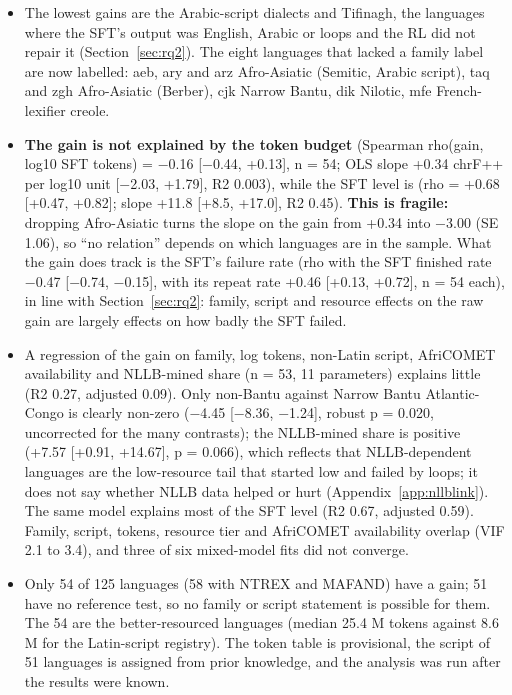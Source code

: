 \begin{itemize}
\item The lowest gains are the Arabic-script dialects and Tifinagh, the languages where the SFT's output was English, Arabic or loops and the RL did not repair it (Section~\ref{sec:rq2}). The eight languages that lacked a family label are now labelled: aeb, ary and arz Afro-Asiatic (Semitic, Arabic script), taq and zgh Afro-Asiatic (Berber), cjk Narrow Bantu, dik Nilotic, mfe French-lexifier creole. 
\item \textbf{The gain is not explained by the token budget} (Spearman rho(gain, log10 SFT tokens) = \ensuremath{-}0.16 [\ensuremath{-}0.44, +0.13], n = 54; OLS slope +0.34 chrF++ per log10 unit [\ensuremath{-}2.03, +1.79], R2 0.003), while the SFT level is (rho = +0.68 [+0.47, +0.82]; slope +11.8 [+8.5, +17.0], R2 0.45). \textbf{This is fragile:} dropping Afro-Asiatic turns the slope on the gain from +0.34 into \ensuremath{-}3.00 (SE 1.06), so ``no relation'' depends on which languages are in the sample. What the gain does track is the SFT's failure rate (rho with the SFT finished rate \ensuremath{-}0.47 [\ensuremath{-}0.74, \ensuremath{-}0.15], with its repeat rate +0.46 [+0.13, +0.72], n = 54 each), in line with Section~\ref{sec:rq2}: family, script and resource effects on the raw gain are largely effects on how badly the SFT failed.
\item A regression of the gain on family, log tokens, non-Latin script, AfriCOMET availability and NLLB-mined share (n = 53, 11 parameters) explains little (R2 0.27, adjusted 0.09). Only non-Bantu against Narrow Bantu Atlantic-Congo is clearly non-zero (\ensuremath{-}4.45 [\ensuremath{-}8.36, \ensuremath{-}1.24], robust p = 0.020, uncorrected for the many contrasts); the NLLB-mined share is positive (+7.57 [+0.91, +14.67], p = 0.066), which reflects that NLLB-dependent languages are the low-resource tail that started low and failed by loops; it does not say whether NLLB data helped or hurt (Appendix~\ref{app:nllblink}). The same model explains most of the SFT level (R2 0.67, adjusted 0.59). Family, script, tokens, resource tier and AfriCOMET availability overlap (VIF 2.1 to 3.4), and three of six mixed-model fits did not converge.
\item Only 54 of 125 languages (58 with NTREX and MAFAND) have a gain; 51 have no reference test, so no family or script statement is possible for them. The 54 are the better-resourced languages (median 25.4 M tokens against 8.6 M for the Latin-script registry). The token table is provisional, the script of 51 languages is assigned from prior knowledge, and the analysis was run after the results were known.
\end{itemize}

